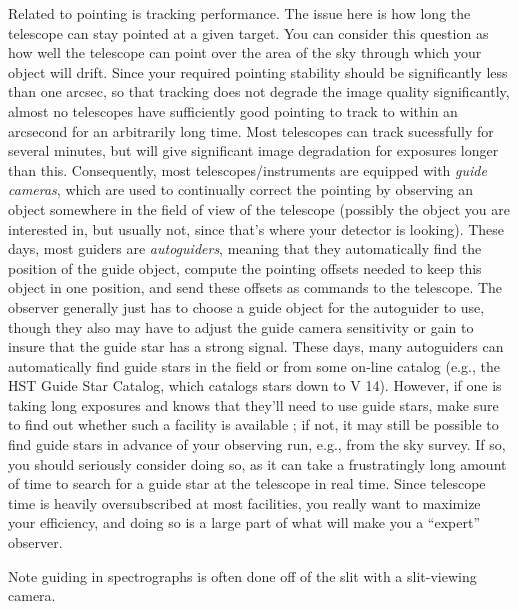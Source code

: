 \documentclass[12pt]{article}
\begin{document}
Related to pointing is tracking performance. The issue here is how
long the telescope can stay pointed at a given target. You can
consider this question as how well the telescope can point over the
area of the sky through which your object will drift. Since your
required pointing stability should be significantly less than one
arcsec, so that tracking does not degrade the image quality
significantly, almost no telescopes have sufficiently good pointing to
track to within an arcsecond for an arbitrarily long time. Most
telescopes can track sucessfully for several minutes, but will give
significant image degradation for exposures longer than this.
Consequently, most telescopes/instruments are equipped with
\emph{guide cameras}, which are used to continually correct the pointing by
observing an object somewhere in the field of view of the telescope
(possibly the object you are interested in, but usually not, since
that's where your detector is looking). These days, most guiders are
\emph{autoguiders}, meaning that they automatically find the position of the
guide object, compute the pointing offsets needed to keep this object
in one position, and send these offsets as commands to the telescope.
The observer generally just has to choose a guide object for the
autoguider to use, though they also may have to adjust the guide
camera sensitivity or gain to insure that the guide star has a strong
signal. These days, many autoguiders can automatically find guide
stars in the field or from some on-line catalog (e.g., the HST Guide
Star Catalog, which catalogs stars down to V 14). However, if one is
taking long exposures and knows that they'll need to use guide stars,
make sure to find out whether such a facility is available ; if not,
it may still be possible to find guide stars in advance of your
observing run, e.g., from the sky survey. If so, you should seriously
consider doing so, as it can take a frustratingly long amount of time
to search for a guide star at the telescope in real time. Since
telescope time is heavily oversubscribed at most facilities, you
really want to maximize your efficiency, and doing so is a large part
of what will make you a ``expert'' observer.

Note guiding in spectrographs is often done off of the slit with a
slit-viewing camera.
\end{document}
